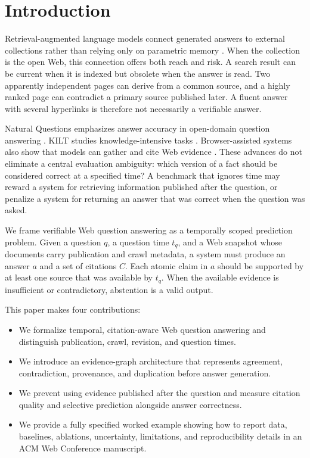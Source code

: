 \section{Introduction}
\label{sec:introduction}

Retrieval-augmented language models connect generated answers to external
collections rather than relying only on parametric memory
\cite{lewis2020rag,karpukhin2020dpr}.  When the collection is the open Web, this
connection offers both reach and risk.  A search result can be current when it
is indexed but obsolete when the answer is read.  Two apparently independent
pages can derive from a common source, and a highly ranked page can contradict
a primary source published later.  A fluent answer with several hyperlinks is
therefore not necessarily a verifiable answer.

Natural Questions emphasizes answer accuracy in open-domain question answering
\cite{kwiatkowski2019natural}.  KILT studies knowledge-intensive tasks
\cite{petroni2021kilt}.  Browser-assisted systems also show that models can
gather and cite Web evidence \cite{nakano2021webgpt}.  These advances
do not eliminate a central evaluation ambiguity: which version of a fact should
be considered correct at a specified time?  A benchmark that ignores time may
reward a system for retrieving information published after the question, or
penalize a system for returning an answer that was correct when the question was
asked.

We frame verifiable Web question answering as a temporally scoped prediction
problem.  Given a question $q$, a question time $t_q$, and a Web snapshot whose
documents carry publication and crawl metadata, a system must produce an answer
$a$ and a set of citations $C$.  Each atomic claim in $a$ should be supported by
at least one source that was available by $t_q$.  When the available evidence is
insufficient or contradictory, abstention is a valid output.

This paper makes four contributions:

\begin{itemize}
  \item We formalize temporal, citation-aware Web question answering and
    distinguish publication, crawl, revision, and question times.
  \item We introduce an evidence-graph architecture that represents agreement,
    contradiction, provenance, and duplication before answer generation.
  \item We prevent using evidence published after the question and measure
    citation quality and selective prediction alongside answer correctness.
  \item We provide a fully specified worked example showing how to report data,
    baselines, ablations, uncertainty, limitations, and reproducibility details
    in an ACM Web Conference manuscript.
\end{itemize}
